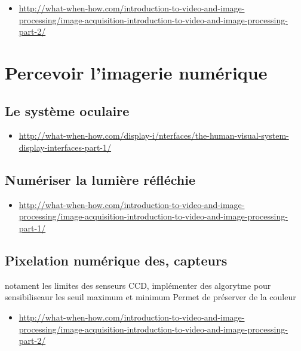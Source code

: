 \documentclass[
  french,
]{book}
\providecommand{\tightlist}{%
  \setlength{\itemsep}{0pt}\setlength{\parskip}{0pt}}
\begin{document}
\begin{itemize}
\tightlist
\item
  \url{http://what-when-how.com/introduction-to-video-and-image-processing/image-acquisition-introduction-to-video-and-image-processing-part-2/}
\end{itemize}

\hypertarget{percevoir-limagerie-numuxe9rique}{%
\section{Percevoir l'imagerie numérique}\label{percevoir-limagerie-numuxe9rique}}

\hypertarget{le-systuxe8me-oculaire-1}{%
\subsection{Le système oculaire}\label{le-systuxe8me-oculaire-1}}

\begin{itemize}
\tightlist
\item
  \url{http://what-when-how.com/display-i/nterfaces/the-human-visual-system-display-interfaces-part-1/}
\end{itemize}

\hypertarget{numuxe9riser-la-lumiuxe8re-ruxe9fluxe9chie-1}{%
\subsection{Numériser la lumière réfléchie}\label{numuxe9riser-la-lumiuxe8re-ruxe9fluxe9chie-1}}

\begin{itemize}
\tightlist
\item
  \url{http://what-when-how.com/introduction-to-video-and-image-processing/image-acquisition-introduction-to-video-and-image-processing-part-1/}
\end{itemize}

\hypertarget{pixelation-numuxe9rique-des-capteurs}{%
\subsection{Pixelation numérique des, capteurs}\label{pixelation-numuxe9rique-des-capteurs}}

notament les limites des senseurs CCD,
implémenter des algorytme pour sensibiliseaur les seuil maximum et minimum
Permet de préserver de la couleur

\begin{itemize}
\tightlist
\item
  \url{http://what-when-how.com/introduction-to-video-and-image-processing/image-acquisition-introduction-to-video-and-image-processing-part-2/}
\end{itemize}
\end{document}
